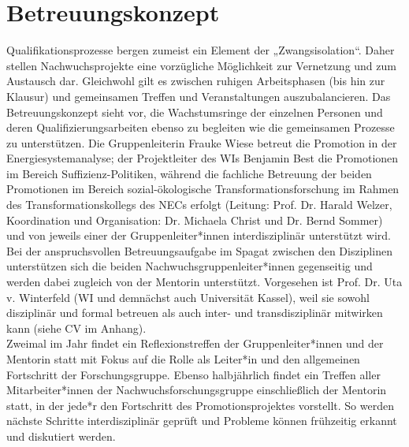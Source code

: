 \documentclass[a4paper,11pt,twoside]{scrartcl}
\begin{document}
\section{Betreuungskonzept}
Qualifikationsprozesse bergen zumeist ein Element der „Zwangsisolation“. Daher stellen Nachwuchsprojekte eine vorzügliche Möglichkeit zur Vernetzung und zum Austausch dar. Gleichwohl gilt es zwischen ruhigen Arbeitsphasen (bis hin zur Klausur) und gemeinsamen Treffen und Veranstaltungen auszubalancieren. Das Betreuungskonzept sieht vor, die Wachstumsringe der einzelnen Personen und deren Qualifizierungsarbeiten ebenso zu begleiten wie die gemeinsamen Prozesse zu unterstützen.
Die Gruppenleiterin Frauke Wiese betreut die Promotion in der Energiesystemanalyse; der Projektleiter des WIs Benjamin Best die Promotionen im Bereich Suffizienz-Politiken, während die fachliche Betreuung der beiden Promotionen im Bereich sozial-ökologische Transformationsforschung im Rahmen des Transformationskollegs des NECs erfolgt (Leitung: Prof. Dr. Harald Welzer, Koordination und Organisation: Dr. Michaela Christ und Dr. Bernd Sommer) und von jeweils einer der Gruppenleiter*innen interdisziplinär unterstützt wird. Bei der anspruchsvollen Betreuungsaufgabe im Spagat zwischen den Disziplinen unterstützen sich die beiden Nachwuchsgruppenleiter*innen gegenseitig und werden dabei zugleich von der Mentorin unterstützt. Vorgesehen ist Prof. Dr. Uta v. Winterfeld (WI und demnächst auch Universität Kassel), weil sie sowohl disziplinär und formal betreuen als auch inter- und transdisziplinär mitwirken kann (siehe CV im Anhang).\\
Zweimal im Jahr findet ein Reflexionstreffen der Gruppenleiter*innen und der Mentorin statt mit Fokus auf die Rolle als Leiter*in und den allgemeinen Fortschritt der Forschungsgruppe. Ebenso halbjährlich findet ein Treffen aller Mitarbeiter*innen der Nachwuchsforschungsgruppe einschließlich der Mentorin statt, in der jede*r den Fortschritt des Promotionsprojektes vorstellt. So werden nächste Schritte interdisziplinär geprüft und Probleme können frühzeitig erkannt und diskutiert werden.\\
\end{document}
